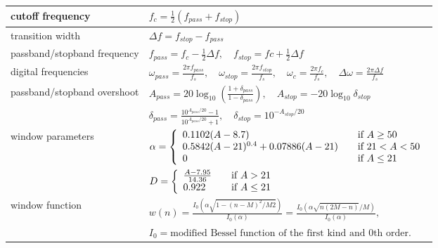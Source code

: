 \begin{tabular}{|l|l|}
	\hline
	cutoff frequency & $f_c=\frac{1}{2}(f_{pass}+f_{stop})$ \\ \hline
	transition width & $\Delta f = f_{stop}-f_{pass}$\\ \hline
	passband/stopband frequency & $f_{pass} = f_c - \frac{1}{2}\Delta f,\quad f_{stop}= fc+\frac{1}{2}\Delta f$\\ \hline
	digital frequencies & $\omega_{pass}=\frac{2\pi f_{pass}}{f_s},\quad \omega_{stop}=\frac{2\pi f_{stop}}{f_s},\quad
						  \omega_{c}=\frac{2\pi f_c}{f_s},\quad \Delta\omega=\frac{2\pi \Delta f}{f_s}$\\ \hline
	passband/stopband overshoot & $A_{pass}=20\log_{10}\left(\frac{1+\delta_{pass}}{1-\delta_{pass}}\right),\quad A_{stop}=-20\log_{10}\delta_{stop}$\\
								& $\delta_{pass}=\frac{10^{A_{pass}/20}-1}{10^{A_{pass}/20}+1},\quad \delta_{stop} = 10^{-A_{stop}/20}$ \\ \hline
	window parameters &
		$\alpha = \left\{
					\begin{array}{l l}
						0.1102(A-8.7)& \quad \text{if } A \geq 50\\
						0.5842(A-21)^{0.4}+0.07886(A-21) & \quad \text{if }21 < A < 50\\
						0 & \quad \text{if } A \leq 21
					\end{array} \right. $\\
	&	$D = \left\{
					\begin{array}{l l}
						\frac{A-7.95}{14.36}& \quad \text{if } A>21\\
						0.922 & \quad \text{if } A \leq 21
					\end{array} \right. $\\ \hline
	window function & $w(n)=\frac{I_0(\alpha\sqrt{1-(n-M)^2/M2})}{I_0(\alpha)}=\frac{I_0(\alpha\sqrt{n(2M-n)}/M)}{I_0(\alpha)},$ \\
	& $I_0=\text{modified Bessel function of the first kind and 0th order.}$\\
	\hline						  
\end{tabular}
